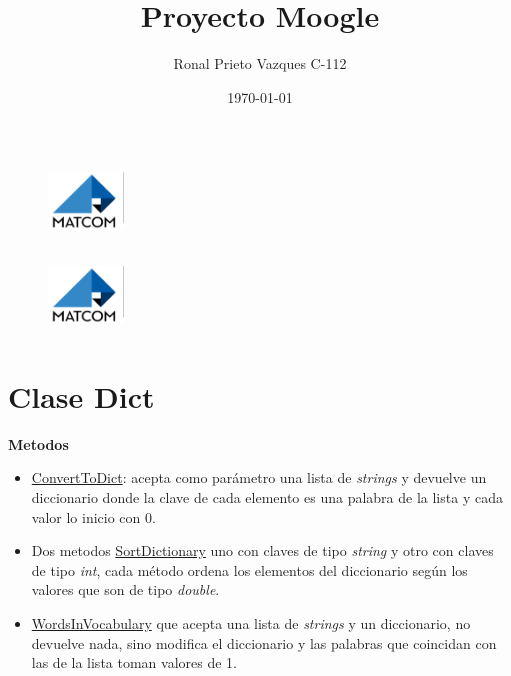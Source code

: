 \documentclass[a4paper,12pt]{article}
\title{Proyecto Moogle}
\author{Ronal Prieto Vazques   C-112}
\date{\today}
\begin{document}
\begin{figure}[t]
    \hspace{13cm}
\includegraphics[width=2cm,height=2cm]{Logo de Matcom.png}
\end{figure}
\maketitle

\tableofcontents
\begin{figure}[t]
    
        \hspace{13cm}
    \includegraphics[width=2cm,height=2cm]{Logo de Matcom.png}
\end{figure}
\newpage
\section{Clase Dict}
\large\textbf{Metodos}

\begin{itemize}
    \item \underline{ConvertToDict}: acepta como parámetro una lista de \textit{strings }y devuelve
    un diccionario donde la clave de cada elemento es una palabra de la
    lista y cada valor lo inicio con 0.
    \item Dos metodos \underline{SortDictionary} uno con claves de tipo \textit{string} y otro con
    claves de tipo \textit{int}, cada método ordena los elementos del diccionario
    según los valores que son de tipo \textit{double}.
    \item \underline{WordsInVocabulary} que acepta una lista de \textit{strings} y un diccionario, no
    devuelve nada, sino modifica el diccionario y las palabras que coincidan
    con las de la lista toman valores de 1.
\end{itemize}
\end{document}
